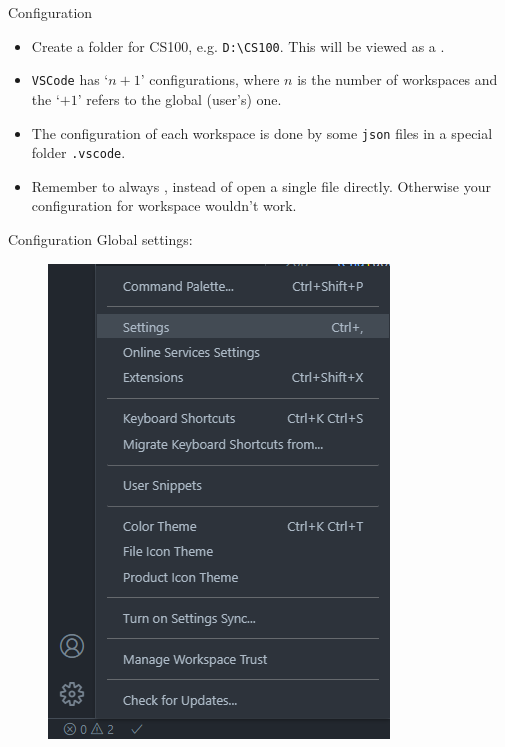 \documentclass[handout]{beamer}
\begin{document}
\begin{frame}{Configuration}
    \begin{itemize}
        \item Create a folder for CS100, e.g. \texttt{D:\textbackslash CS100}. This will be viewed as a .
        \pause
        \item \texttt{VSCode} has `\(n+1\)' configurations, where \(n\) is the number of workspaces and the `\(+1\)' refers to the global (user's) one.
        \item The configuration of each workspace is done by some \texttt{json} files in a special folder \texttt{.vscode}.
        \pause
        \item Remember to always , instead of open a single file directly. Otherwise your configuration for workspace wouldn't work.
    \end{itemize}
\end{frame}

\begin{frame}{Configuration}
    Global settings:
    \begin{figure}[h]
        \centering
        \includegraphics[height=0.75\textheight]{img/vsc_global.png}
    \end{figure}
\end{frame}
\end{document}
